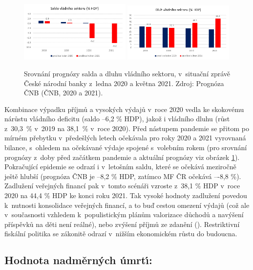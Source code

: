 \begin{figure}[ht]
    \centering
    \includegraphics[width=0.49\textwidth]{./pic/saldo.png} \includegraphics[width=0.49\textwidth]{./pic/dluh.png}
    \caption{Srovnání prognózy salda a dluhu vládního sektoru, v~situační zprávě České národní banky z~ledna 2020 a května 2021. Zdroj: Prognóza ČNB (ČNB, 2020 a 2021).}
    \label{fig:110-vlada}
\end{figure}

Kombinace výpadku příjmů a vysokých výdajů v~roce 2020 vedla ke skokovému nárůstu vládního deficitu (saldo --6,2 \% HDP), jakož i vládního dluhu (růst z~30,3~\% v~2019 na 38,1~\% v~roce 2020). Před nástupem pandemie se přitom po mírném přebytku v~předešlých letech očekávala pro roky 2020 a 2021 vyrovnaná bilance, s~ohledem na očekávané výdaje spojené s~volebním rokem (pro srovnání prognózy z~doby před začátkem pandemie a aktuální prognózy viz obrázek \ref{fig:110-vlada}). Pokračující epidemie se odrazí i v~letošním saldu, které se očekává meziročně ještě hlubší (pro\-gnó\-za ČNB je --8,2 \% HDP, zatímco MF ČR očekává –-8,8 \%). Zadlužení veřejných financí pak v~tomto scénáři vzroste z~38,1 \% HDP v~roce 2020 na 44,4 \% HDP ke konci roku 2021. Tak vysoké hodnoty zadlužení povedou k~nutnosti konsolidace veřejných financí, a to buď cestou omezení výdajů (což ale v~současnosti vzhledem k~populistickým plánům valorizace důchodů a navýšení příspěvků na děti není reálné), nebo zvýšení příjmů ze zdanění (\cite{NRR2021}). Restriktivní fiskální politika se zákonitě odrazí v~nižším ekonomickém růstu do budoucna.

\subsection*{Hodnota nadm\v{e}rn\'{y}ch \'{u}mrt\'{\i}:} 

